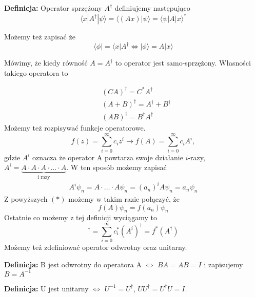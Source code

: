 \textbf{Definicja:} Operator sprzężony $A^{\dagger}$ definiujemy następująco
\begin{equation*}
	\langle x | A^{\dagger} | \psi \rangle = \langle (Ax)  | \psi \rangle = \langle \psi | A | x \rangle^{*}
\end{equation*}

Możemy też zapisać że 
\begin{equation*}
	\langle \phi |  = \langle x | A^{\dagger} \iff | \phi \rangle = A | x \rangle
\end{equation*}

Mówimy, że kiedy równość $A = A^{\dagger}$ to operator jest samo-sprzężony. Własności takiego operatora to

\begin{equation*}
	\begin{split}
		&(CA)^{\dagger} = C^* A^{\dagger} \\
		&(A + B)^{\dagger} = A^{\dagger} + B^{\dagger}\\
		&(AB)^{\dagger} = B^{\dagger}A^{\dagger}
	\end{split}
\end{equation*}
Możemy też rozpisywać funkcje operatorowe.
\begin{equation*}
	f(z) = \sum_{i = 0}^{\infty} c_i z^i \rightarrow f(A) = \sum_{i = 0}^{\infty} c_i A^i,
\end{equation*}
gdzie $A^i$ oznacza że operator A powtarza swoje działanie $i$-razy, $A^i = \underbrace{A \cdot A \cdot A \cdot \dotsc \cdot A}_{\text{i razy}}$.
W ten sposób możemy zapisać
\begin{equation*}
	\begin{split}
		A^i \psi_n = A \cdot \dotsc \cdot A \psi_n = (a_n)^i
		A\psi_n = a_n \psi_n
	\end{split}
\end{equation*}
Z powyższych $(*)$ możemy w takim razie połączyć, że
\begin{equation*}
	f(A) \psi_n = f(a_n) \psi_n
\end{equation*}
Ostatnie co możemy z tej definicji wyciągamy to
\begin{equation*}
	[f(A)]^{\dagger} = \sum_{i = 0}^{\infty} c_i^* (A^i)^{\dagger} = f^*(A^{\dagger})
\end{equation*}
Możemy też zdefiniować operator odwrotny oraz unitarny.

\textbf{Definicja:} B jest odwrotny do operatora A $\iff$ $BA = AB = I$ i zapisujemy $B = A^{-1}$

\textbf{Definicja:} U jest unitarny $\iff$ $U^{-1} = U^{\dagger}$, $U U^{\dagger} = U^{\dagger} U = I$. 

